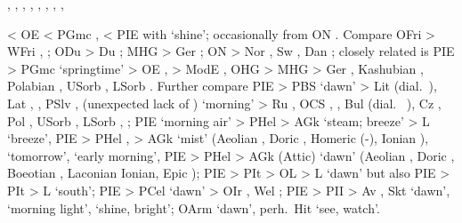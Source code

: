 \documentclass[12pt,letterpaper,oneside,article,draft]{memoir}
\begin{document}
\begin{Lemma}
\begin{Also}
	, , , , , , , , 
\end{Also}
\begin{Etymology}
	< OE  < PGmc ,  < PIE  with  ‘shine’;
	occasionally from ON .
	Compare
	OFri  > WFri , ;
	ODu  > Du ;
	MHG  > Ger ;
	ON  > Nor , Sw , Dan ;
	closely related is
	PIE  > PGmc  ‘springtime’ > OE ,  > ModE ,
		OHG  > MHG  > Ger , Kashubian , Polabian ,
		USorb , LSorb .
	Further compare
	PIE  > PBS  ‘dawn’ > Lit  (dial.\ ),
		Lat , ,
		PSlv ,  (unexpected lack of ) ‘morning’ > Ru  ,
		OCS  ,  ,
		Bul   (dial.\  ),
		Cz , Pol , USorb , LSorb , ;
	PIE  ‘morning air’ > PHel  > AGk   ‘steam; breeze’ 
		> L  ‘breeze’,
	PIE  > PHel ,  > AGk   ‘mist’
		(Aeolian  , Doric  ,
			Homeric   (-), Ionian  ),
		  ‘tomorrow’,   ‘early morning’,
	PIE  > PHel  > AGk (Attic)   ‘dawn’
		(Aeolian  , Doric  , Boeotian  ,
		Laconian   Ionian, Epic  );
	PIE  > PIt  > OL  > L  ‘dawn’
		but also PIE  > PIt  > L  ‘south’;
	PIE  > PCel  ‘dawn’ > OIr , Wel ;
	PIE  > PII  > Av  ,
		Skt   ‘dawn’,   ‘morning light’,
		  ‘shine, bright’;
	OArm   ‘dawn’, perh.\ Hit  ‘see, watch’.

\end{Etymology}
\end{Lemma}
\end{document}
